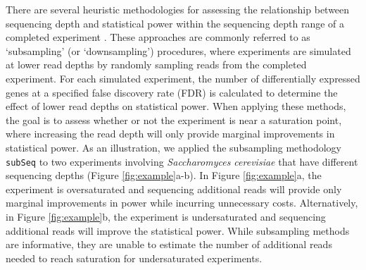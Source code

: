 \documentclass[11pt]{article}
\begin{document}
There are several heuristic methodologies for assessing the relationship between sequencing depth and statistical power within the sequencing depth range of a completed experiment \cite{Tarazona:2011fi,Busby:2013wf,Robinson:2014ho}. These approaches are commonly referred to as `subsampling' (or `downsampling') procedures, where experiments are simulated at lower read depths by randomly sampling reads from the completed experiment. For each simulated experiment, the number of differentially expressed genes at a specified false discovery rate (FDR) is calculated to determine the effect of lower read depths on statistical power. When applying these methods, the goal is to assess whether or not the experiment is near a saturation point, where increasing the read depth will only provide marginal improvements in statistical power. As an illustration, we applied the subsampling methodology {\tt subSeq} \cite{Robinson:2014ho} to two experiments involving \textit{Saccharomyces cerevisiae} that have different sequencing depths (Figure \ref{fig:example}a-b). In Figure \ref{fig:example}a, the experiment is oversaturated and sequencing additional reads will provide only marginal improvements in power while incurring unnecessary costs. Alternatively, in Figure \ref{fig:example}b, the experiment is undersaturated and sequencing additional reads will improve the statistical power. While subsampling methods are informative, they are unable to estimate the number of additional reads needed to reach saturation for undersaturated experiments.
\end{document}
